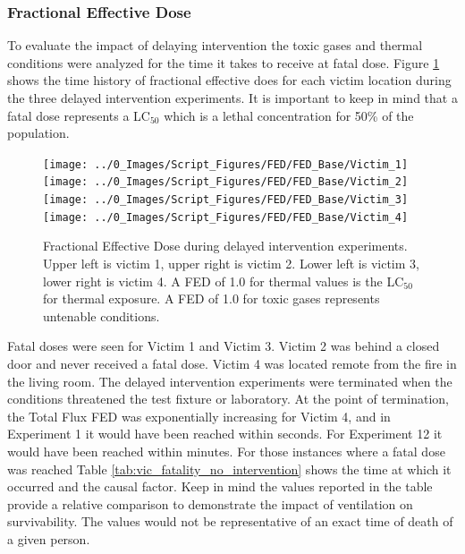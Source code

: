 \documentclass[12pt,oneside]{book}
\begin{document}
\subsubsection{Fractional Effective Dose}
To evaluate the impact of delaying intervention the toxic gases and thermal conditions were analyzed for the time it takes to receive at fatal dose. Figure \ref{fig:FED_Base_no_int} shows the time history of fractional effective does for each victim location during the three delayed intervention experiments. It is important to keep in mind that a fatal dose represents a LC$_{50}$ which is a lethal concentration for 50\% of the population. 

\begin{figure}[H]
	\centering
	\texttt{[image: ../0\_Images/Script\_Figures/FED/FED\_Base/Victim\_1]}
	\texttt{[image: ../0\_Images/Script\_Figures/FED/FED\_Base/Victim\_2]}
	\texttt{[image: ../0\_Images/Script\_Figures/FED/FED\_Base/Victim\_3]}
	\texttt{[image: ../0\_Images/Script\_Figures/FED/FED\_Base/Victim\_4]}
	\caption[Fractional Effective Dose - Delayed Intervention]{Fractional Effective Dose during delayed intervention experiments. Upper left is victim 1, upper right is victim 2. Lower left is victim 3, lower right is victim 4. A FED of 1.0 for thermal values is the LC$_{50}$ for thermal exposure. A FED of 1.0 for toxic gases represents untenable conditions.}
	\label{fig:FED_Base_no_int}
\end{figure}

Fatal doses were seen for Victim 1 and Victim 3. Victim 2 was behind a closed door and never received a fatal dose. Victim 4 was located remote from the fire in the living room. The delayed intervention experiments were terminated when the conditions threatened the test fixture or laboratory. At the point of termination, the Total Flux FED was exponentially increasing for Victim 4, and in Experiment 1 it would have been reached within seconds. For Experiment 12 it would have been reached within minutes. For those instances where a fatal dose was reached Table \ref{tab:vic_fatality_no_intervention} shows the time at which it occurred and the causal factor.  Keep in mind the values reported in the table provide a relative comparison to demonstrate the impact of ventilation on survivability.  The values would not be representative of an exact time of death of a given person. 
\end{document}
